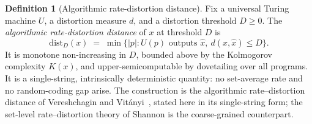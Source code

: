 \documentclass[11pt,a4paper]{article}
\theoremstyle{plain}
\theoremstyle{definition}
\newtheorem{definition}[theorem]{Definition}
\theoremstyle{remark}
\newcommand{\distD}{\mathrm{dist}_{D}}
\begin{document}
\begin{definition}[Algorithmic rate-distortion distance]
\label{def:ard}
Fix a universal Turing machine $U$, a distortion measure $d$, and a
distortion threshold $D\geq 0$. The \emph{algorithmic rate-distortion
distance} of $x$ at threshold $D$ is
\begin{equation}\label{eq:distD-def}
  \distD(x) \;=\; \min\bigl\{|p| : U(p)\text{ outputs }\hat x,\
  d(x,\hat x)\leq D\bigr\}.
\end{equation}
It is monotone non-increasing in $D$, bounded above by the Kolmogorov
complexity $K(x)$, and upper-semicomputable by dovetailing over all
programs. It is a single-string, intrinsically deterministic
quantity: no set-average rate and no random-coding gap arise. The
construction is the algorithmic rate--distortion distance of
Vereshchagin and Vit\'anyi~\citep{vereshchagin2010rate}, stated
here in its single-string form; the set-level rate--distortion
theory of Shannon is the coarse-grained
counterpart.
\end{definition}
\end{document}
